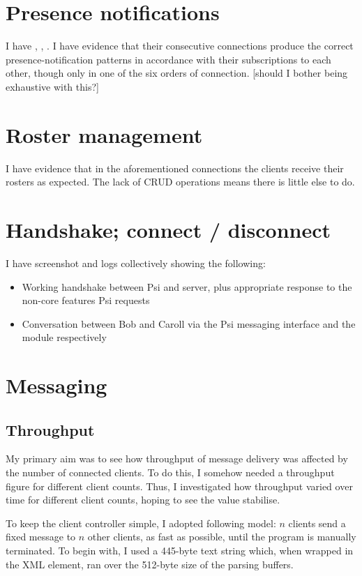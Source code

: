 \documentclass[12pt,a4paper,twoside,openright]{report}
\begin{document}
{\section{Presence notifications}
I have , , . I have evidence that their consecutive connections produce the correct presence-notification patterns in accordance with their subscriptions to each other, though only in one of the six orders of connection. [should I bother being exhaustive with this?]

\section{Roster management}
I have evidence that in the aforementioned connections the clients receive their rosters as expected. The lack of CRUD operations means there is little else to do.

\section{Handshake; connect / disconnect}
I have screenshot and logs collectively showing the following:
\begin{itemize}
  \item Working handshake between Psi and server, plus appropriate  response to the non-core features Psi requests
  \item Conversation between Bob and Caroll via the Psi messaging interface and the  module respectively
\end{itemize}

\section{Messaging}
\subsection{Throughput}
My primary aim was to see how throughput of message delivery was affected by the number of connected clients. To do this, I somehow needed a throughput figure for different client counts. Thus, I investigated how throughput varied over time for different client counts, hoping to see the value stabilise.

To keep the client controller simple, I adopted following model: $n$ clients send a fixed message to $n$ other clients, as fast as possible, until the program is manually terminated. To begin with, I used a 445-byte text string which, when wrapped in the XML  element, ran over the 512-byte size of the parsing buffers.

}
\end{document}
